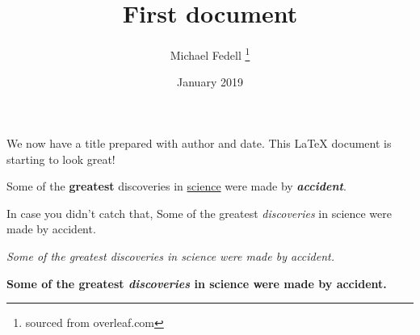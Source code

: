 \documentclass[12pt, letterpaper]{article}
\title{First document}
\author{Michael Fedell \thanks{sourced from overleaf.com}}
\date{January 2019}
\begin{document}
\maketitle
We now have a title prepared with author and date.
This \LaTeX{} document is starting to look great!

Some of the \textbf{greatest}
discoveries in \underline{science}
were made by \textbf{\textit{accident}}.

In case you didn't catch that,  
Some of the greatest \emph{discoveries}
in science
were made by accident.

\textit{Some of the greatest \emph{discoveries}
in science
were made by accident.}

\textbf{Some of the greatest \emph{discoveries}
in science
were made by accident.}
\end{document}

